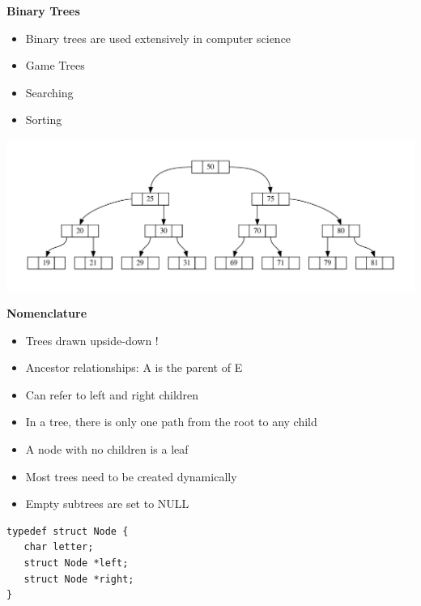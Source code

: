 \newpage	
{\samepage	
\begin{center}	
{\Large{\bf Binary Trees}}	
\end{center}	
\begin{itemize}	
\item Binary trees are used extensively in computer science	
\item Game Trees	
\item Searching	
\item Sorting	
\end{itemize}	
\begin{center}	
\includegraphics[width=\textwidth]{../Images/Linkedb.pdf}	
\end{center}	
}	

\newpage	
{\samepage	
\begin{center}	
{\Large{\bf Nomenclature}}	
\end{center}	
\begin{itemize}	
\item Trees drawn upside-down !	
\item Ancestor relationships: A is the parent of E	
\item Can refer to left and right children	
\item In a tree, there is only one path from the root to any child	
\item A node with no children is a leaf	
\item Most trees need to be created dynamically	
\item Empty subtrees are set to NULL	
\end{itemize}	
\begin{verbatim}	
typedef struct Node {	
   char letter;	
   struct Node *left;	
   struct Node *right;	
}	
\end{verbatim}	
}	

